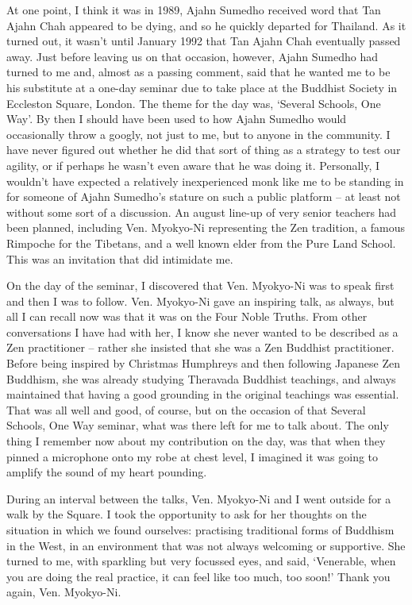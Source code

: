 At one point, I think it was in 1989, Ajahn Sumedho received word that
Tan Ajahn Chah appeared to be dying, and so he quickly departed for
Thailand. As it turned out, it wasn't until January 1992 that Tan Ajahn
Chah eventually passed away. Just before leaving us on that occasion,
however, Ajahn Sumedho had turned to me and, almost as a passing
comment, said that he wanted me to be his substitute at a one-day
seminar due to take place at the Buddhist Society in Eccleston Square,
London. The theme for the day was, `Several Schools, One Way'. By then I
should have been used to how Ajahn Sumedho would occasionally throw a
googly, not just to me, but to anyone in the community. I have never
figured out whether he did that sort of thing as a strategy to test our
agility, or if perhaps he wasn't even aware that he was doing it.
Personally, I wouldn't have expected a relatively inexperienced monk
like me to be standing in for someone of Ajahn Sumedho's stature on such
a public platform -- at least not without some sort of a discussion. An
august line-up of very senior teachers had been planned, including Ven.
Myokyo-Ni representing the Zen tradition, a famous Rimpoche for the
Tibetans, and a well known elder from the Pure Land School. This was an
invitation that did intimidate me.

On the day of the seminar, I discovered that Ven. Myokyo-Ni was to speak
first and then I was to follow. Ven. Myokyo-Ni gave an inspiring talk,
as always, but all I can recall now was that it was on the Four Noble
Truths. From other conversations I have had with her, I know she never
wanted to be described as a Zen practitioner -- rather she insisted that
she was a Zen Buddhist practitioner. Before being inspired by Christmas
Humphreys and then following Japanese Zen Buddhism, she was already studying
Theravada Buddhist teachings, and always maintained that having a good
grounding in the original teachings was essential. That was all well and
good, of course, but on the occasion of that Several Schools, One Way
seminar, what was there left for me to talk about. The only thing I
remember now about my contribution on the day, was that when they pinned
a microphone onto my robe at chest level, I imagined it was going to
amplify the sound of my heart pounding.

During an interval between the talks, Ven. Myokyo-Ni and I went outside for
a walk by the Square. I took the opportunity to ask for her thoughts on
the situation in which we found ourselves: practising traditional forms
of Buddhism in the West, in an environment that was not always welcoming
or supportive. She turned to me, with sparkling but very focussed eyes,
and said, `Venerable, when you are doing the real practice, it can
feel like too much, too soon!' Thank you again, Ven. Myokyo-Ni.

